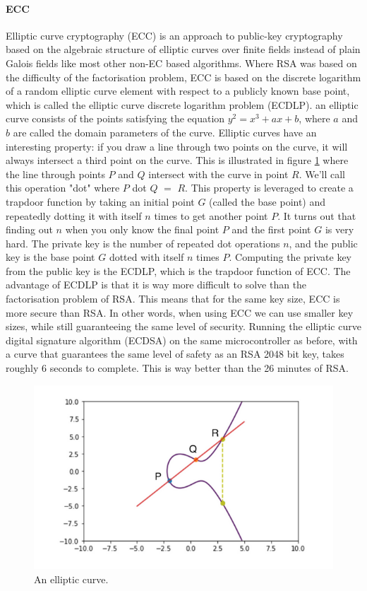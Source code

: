 \documentclass[11pt]{article}
\begin{document}
\paragraph{ECC} Elliptic curve cryptography (ECC) is an approach to public-key cryptography based on the algebraic structure of elliptic curves over finite fields instead of plain Galois fields like most other non-EC based algorithms. Where RSA was based on the difficulty of the factorisation problem, ECC  is based on the discrete logarithm of a random elliptic curve element with respect to a publicly known base point, which is called the elliptic curve discrete logarithm problem (ECDLP)\cite{ECCwiki}. an elliptic curve consists of the points satisfying the equation $ y^2 = x^3 + ax + b$, where $a$ and $b$ are called the domain parameters of the curve. Elliptic curves have an interesting property: if you draw a line through two points on the curve, it will always intersect a third point on the curve. This is illustrated in figure \ref{fig:ECC} where the line through points $P$ and $Q$ intersect with the curve in point $R$. We'll call this operation "dot" where $P$ dot $Q$ $=$ $R$. This property is leveraged to create a trapdoor function by taking an initial point $G$ (called the base point) and repeatedly dotting it with itself $n$ times to get another point $P$. It turns out that finding out $n$ when you only know the final point $P$ and the first point $G$ is very hard. The private key is the number of repeated dot operations $n$, and the public key is the base point $G$ dotted with itself $n$ times $P$. Computing the private key from the public key is the ECDLP, which is the trapdoor function of ECC. The advantage of ECDLP is that it is way more difficult to solve than the factorisation problem of RSA. This means that for the same key size, ECC is more secure than RSA. In other words, when using ECC we can use smaller key sizes, while still guaranteeing the same level of security. Running the elliptic curve digital signature algorithm (ECDSA) on the same microcontroller as before, with a curve that guarantees the same level of safety as an RSA 2048 bit key, takes roughly 6 seconds to complete. This is way better than the 26 minutes of RSA.

\begin{figure}[h]
	\label{fig:ECC}
	\centering
	\includegraphics[width=\textwidth]{ECC.png}
	\caption{An elliptic curve. \cite{ECCbasics}}
\end{figure} 
\end{document}
